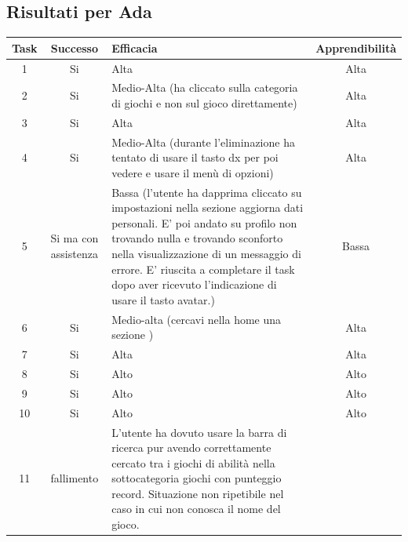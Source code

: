 \documentclass[../Report.tex]{subfiles}
\begin{document}
    \subsection{Risultati per Ada}
    \begin{table}[H]
        \begin{tabular}{|c|c|p{5cm}|c|}
            \hline
            Task & Successo & Efficacia & Apprendibilità \\
            \hline
            1 & Si & Alta & Alta \\
            \hline
            2 & Si & Medio-Alta (ha cliccato sulla categoria di giochi e non sul gioco direttamente) & Alta \\
            \hline
            3 & Si & Alta & Alta \\
            \hline
            4 & Si & Medio-Alta (durante l'eliminazione ha tentato di usare il tasto dx per poi vedere e usare il menù di opzioni) & Alta \\
            \hline
            5 & Si ma con assistenza & Bassa (l’utente ha dapprima cliccato su impostazioni nella sezione aggiorna dati personali. E’ poi andato su profilo non trovando nulla e trovando sconforto nella visualizzazione di un messaggio di errore. E’ riuscita a completare il task dopo aver ricevuto l’indicazione di usare il tasto avatar.) & Bassa \\
            \hline
            6 & Si & Medio-alta (cercavi nella home una sezione ) & Alta \\
            \hline
            7 & Si & Alta & Alta \\
            \hline
            8 & Si & Alto & Alto \\
            \hline
            9 & Si & Alto & Alto \\
            \hline
            10 & Si & Alto & Alto \\
            \hline
            11 & fallimento & L’utente ha dovuto usare la barra di ricerca pur avendo correttamente cercato tra i giochi di abilità nella sottocategoria giochi con punteggio record. Situazione non ripetibile nel caso in cui non conosca il nome del gioco.  & \\
            \hline
        \end{tabular}
    \end{table}
\end{document}
